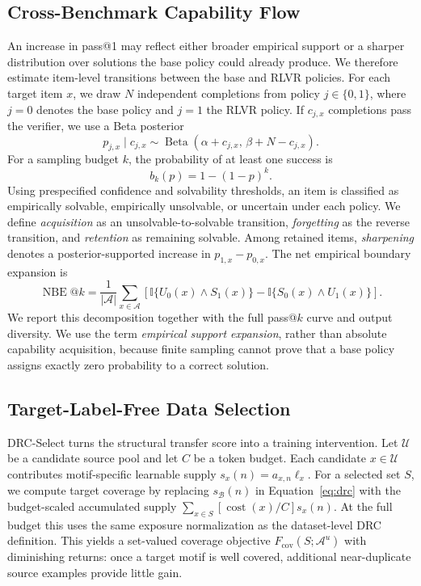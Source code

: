 \subsection{Cross-Benchmark Capability Flow}
\label{sec:capability-flow}

An increase in pass@1 may reflect either broader empirical support or a sharper
distribution over solutions the base policy could already produce.  We
therefore estimate item-level transitions between the base and RLVR policies.
For each target item $x$, we draw $N$ independent completions from policy
$j\in\{0,1\}$, where $j=0$ denotes the base policy and $j=1$ the RLVR policy.
If $c_{j,x}$ completions pass the verifier, we use a Beta posterior
\begin{equation}
    p_{j,x}\mid c_{j,x}
    \sim \operatorname{Beta}\!\left(
        \alpha+c_{j,x},\,\beta+N-c_{j,x}
    \right).
\end{equation}
For a sampling budget $k$, the probability of at least one success is
\begin{equation}
    b_k(p)=1-(1-p)^k.
\end{equation}
Using prespecified confidence and solvability thresholds, an item is classified
as empirically solvable, empirically unsolvable, or uncertain under each
policy.  We define \emph{acquisition} as an unsolvable-to-solvable transition,
\emph{forgetting} as the reverse transition, and \emph{retention} as remaining
solvable.  Among retained items, \emph{sharpening} denotes a posterior-supported
increase in $p_{1,x}-p_{0,x}$.  The net empirical boundary expansion is
\begin{equation}
    \operatorname{NBE}@k
    = \frac{1}{|\mathcal{A}|}
      \sum_{x\in\mathcal{A}}
      \left[
        \mathbb{I}\{U_0(x)\wedge S_1(x)\}
        -\mathbb{I}\{S_0(x)\wedge U_1(x)\}
      \right].
\end{equation}
We report this decomposition together with the full pass@$k$ curve and output
diversity.  We use the term \emph{empirical support expansion}, rather than
absolute capability acquisition, because finite sampling cannot prove that a
base policy assigns exactly zero probability to a correct solution.

\subsection{Target-Label-Free Data Selection}
\label{sec:drc-select}

DRC-Select turns the structural transfer score into a training intervention.  Let
$\mathcal{U}$ be a candidate source pool and let $C$ be a token budget.  Each
candidate $x\in\mathcal{U}$ contributes motif-specific learnable supply
$s_x(n)=a_{x,n}\ell_x$.  For a selected set $S$, we compute target coverage by
replacing $s_{\mathcal{B}}(n)$ in Equation~\ref{eq:drc} with the budget-scaled
accumulated supply
$\sum_{x\in S}[\operatorname{cost}(x)/C]s_x(n)$.  At the full budget this uses
the same exposure normalization as the dataset-level DRC definition.  This
yields a set-valued coverage objective
$F_{\mathrm{cov}}(S;\mathcal{A}^{u})$ with diminishing returns: once a target
motif is well covered, additional near-duplicate source examples provide
little gain.

